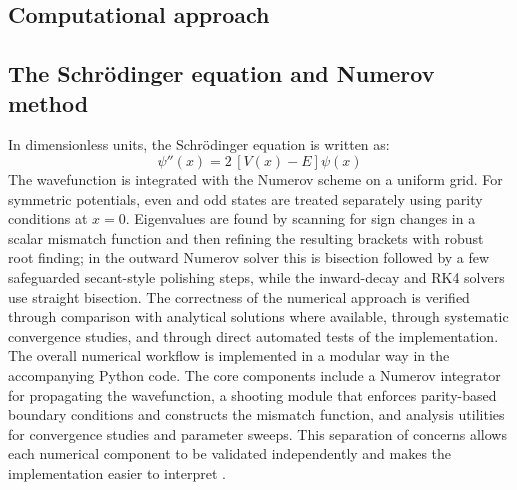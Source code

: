 \documentclass[11pt]{article}
\begin{document}
\begin{refsection}
    \section{Computational approach}
        \subsection{The Schr\"odinger equation and Numerov method}
            In dimensionless units, the Schr\"odinger equation is written as:
            \begin{equation}
            \psi''(x) = 2\,[V(x)-E]\psi(x)
            \end{equation}
            The wavefunction is integrated with the Numerov scheme on a uniform grid. For symmetric potentials, even and odd states are treated separately using parity conditions at $x=0$. Eigenvalues are found by scanning for sign changes in a scalar mismatch function and then refining the resulting brackets with robust root finding; in the outward Numerov solver this is bisection followed by a few safeguarded secant-style polishing steps, while the inward-decay and RK4 solvers use straight bisection. The correctness of the numerical approach is verified through comparison with analytical solutions where available, through systematic convergence studies, and through direct automated tests of the implementation. \\

            The overall numerical workflow is implemented in a modular way in the accompanying Python code. The core components include a Numerov integrator for propagating the wavefunction, a shooting module that enforces parity-based boundary conditions and constructs the mismatch function, and analysis utilities for convergence studies and parameter sweeps. This separation of concerns allows each numerical component to be validated independently and makes the implementation easier to interpret \cite{Pang_2006}.


\end{refsection}
\end{document}
